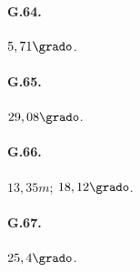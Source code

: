 \begin{multicols}{3}
\paragraph{G.64.}$5,71\grado$.

\paragraph{G.65.}$29,08\grado$.

\paragraph{G.66.}$13,35\unit{m}$; $18,12\grado$.

\paragraph{G.67.}$25,4\grado$.
\end{multicols}

